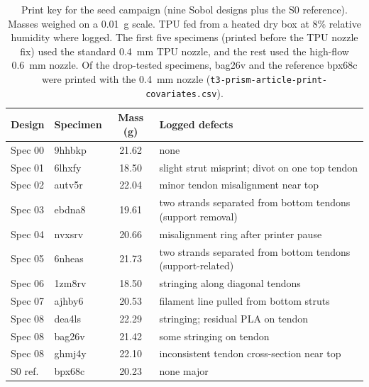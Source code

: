 \documentclass[11pt]{article}
\begin{document}
\begin{table}[ht]
  \centering
  \caption{Print key for the seed campaign (nine Sobol designs plus the S0
    reference). Masses weighed on a \SI{0.01}{g} scale. TPU fed from a heated
    dry box at 8\% relative humidity where logged. The first five specimens
    (printed before the TPU nozzle fix) used the standard \SI{0.4}{mm} TPU
    nozzle, and the rest used the high-flow \SI{0.6}{mm} nozzle. Of the
    drop-tested specimens, bag26v and the reference bpx68c were printed
    with the \SI{0.4}{mm} nozzle
    (\texttt{t3-prism-article-print-covariates.csv}).}
  \label{tab:si-printkey}
  \small
  \begin{tabular}{@{}llS[table-format=2.2]l@{}}
    \toprule
    Design & Specimen & {Mass (g)} & Logged defects \\
    \midrule
    Spec 00 & 9hhbkp & 21.62 & none \\
    Spec 01 & 6lhxfy & 18.50 & slight strut misprint; divot on one top tendon \\
    Spec 02 & autv5r & 22.04 & minor tendon misalignment near top \\
    Spec 03 & ebdna8 & 19.61 & two strands separated from bottom tendons (support removal) \\
    Spec 04 & nvxsrv & 20.66 & misalignment ring after printer pause \\
    Spec 05 & 6nheas & 21.73 & two strands separated from bottom tendons (support-related) \\
    Spec 06 & 1zm8rv & 18.50 & stringing along diagonal tendons \\
    Spec 07 & ajhby6 & 20.53 & filament line pulled from bottom struts \\
    Spec 08 & dea4ls & 22.29 & stringing; residual PLA on tendon \\
    Spec 08 & bag26v & 21.42 & some stringing on tendon \\
    Spec 08 & ghmj4y & 22.10 & inconsistent tendon cross-section near top \\
    S0 ref. & bpx68c & 20.23 & none major \\
    \bottomrule
  \end{tabular}
\end{table}
\end{document}
